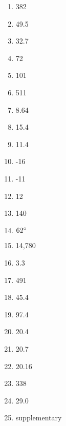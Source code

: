\documentclass[../uilmath.tex]{subfiles}
\begin{document}
\begin{enumerate}[label=\bfseries\arabic*.]
    \item %
    382

    \item %
    49.5

    \item %
    32.7

    \item %
    72

    \item %
    101

    \item %
    511

    \item %
    8.64

    \item %
    15.4

    \item %
    11.4

    \item %
    -16

    \item %
    -11

    \item %
    12

    \item %
    140

    \item %
    $62\degree$

    \item %
    14,780

    \item %
    3.3

    \item %
    491

    \item %
    45.4

    \item %
    97.4

    \item %
    20.4

    \item %
    20.7

    \item %
    20.16

    \item %
    338

    \item %
    29.0

    \item %
    supplementary 


\end{enumerate}
\end{document}
